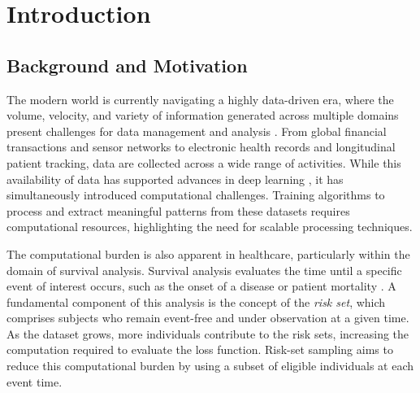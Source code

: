 \documentclass[a4paper,twoside,12pt]{report}
\begin{document}


\clearpage
{} %

\chapter{Introduction}
\label{ch:introduction}

\section{Background and Motivation}

The modern world is currently navigating a highly data-driven era, where the volume, velocity, and variety of information generated across multiple domains present challenges for data management and analysis \citep{Laney2001}. From global financial transactions and sensor networks to electronic health records and longitudinal patient tracking, data are collected across a wide range of activities. While this availability of data has supported advances in deep learning \citep{LeCun2015}, it has simultaneously introduced computational challenges. Training algorithms to process and extract meaningful patterns from these datasets requires computational resources, highlighting the need for scalable processing techniques.

The computational burden is also apparent in healthcare, particularly within the domain of survival analysis. Survival analysis evaluates the time until a specific event of interest occurs, such as the onset of a disease or patient mortality \citep{Cox1972}. A fundamental component of this analysis is the concept of the \textit{risk set}, which comprises subjects who remain event-free and under observation at a given time. As the dataset grows, more individuals contribute to the risk sets, increasing the computation required to evaluate the loss function. Risk-set sampling aims to reduce this computational burden by using a subset of eligible individuals at each event time.
\end{document}
